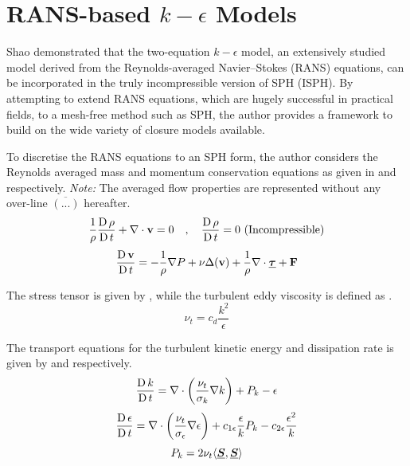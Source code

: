 \section[RANS-based k-epsilon Models]{RANS-based $k-\epsilon$ Models}

Shao \parencite{Shao2006} demonstrated that the two-equation $k-\epsilon$ model, an extensively studied model derived from the Reynolds-averaged Navier–Stokes (RANS) equations, can be incorporated in the truly incompressible version of SPH (ISPH). By attempting to extend RANS equations, which are hugely successful in practical fields, to a mesh-free method such as SPH, the author provides a framework to build on the wide variety of closure models available.

To discretise the RANS equations to an SPH form, the author considers the Reynolds averaged mass and momentum conservation equations as given in  and  respectively. \textit{Note:} The averaged flow properties are represented without any over-line $\overline{(...)}$ hereafter.
\begin{equation}
    \frac{1}{\rho} \frac{\operatorname{D} \rho}{\operatorname{D} t} + \nabla \cdot \mathbf{v} = 0 \quad , \quad \frac{\operatorname{D} \rho}{\operatorname{D} t} = 0 \text{ (Incompressible)}
    \label{eq:Shao2006-rans-continuity-governing}
\end{equation}
\begin{equation}
    \frac{\operatorname{D} \mathbf{v}}{\operatorname{D} t} = -\frac{1}{\rho}\nabla P + \nu \Delta( \mathbf{v} ) + \frac{1}{\rho} \nabla \cdot \underline{\bm{\tau}} + \mathbf{F}
    \label{eq:Shao2006-rans-mom-governing}
\end{equation}

The stress tensor is given by , while the turbulent eddy viscosity is defined as .
\begin{equation}
    \nu_t = c_d \frac{k^2}{\epsilon}
    \label{eq:Shao2006-turbulent-eddy-visc}
\end{equation}

The transport equations for the turbulent kinetic energy and dissipation rate is given by  and  respectively.
\begin{equation}
    \frac{\operatorname{D} k}{\operatorname{D} t} = \nabla \cdot \bigg( \frac{\nu_t}{\sigma_k} \nabla k \bigg) + P_k - \epsilon
    \label{eq:Shao2006-k-transport-eq}
\end{equation}
\begin{equation}
    \frac{\operatorname{D} \epsilon}{\operatorname{D} t} = \nabla \cdot \bigg( \frac{\nu_t}{\sigma_{\epsilon}} \nabla \epsilon \bigg) + c_{1\epsilon} \frac{\epsilon}{k} P_k - c_{2\epsilon} \frac{\epsilon^2}{k}
    \label{eq:Shao2006-eps-transport-eq}
\end{equation}
\begin{equation}
    P_k = 2\nu_t \langle \underline{\bm{S}}, \underline{\bm{S}} \rangle
    \label{eq:Shao2006-k-production-term}
\end{equation}

